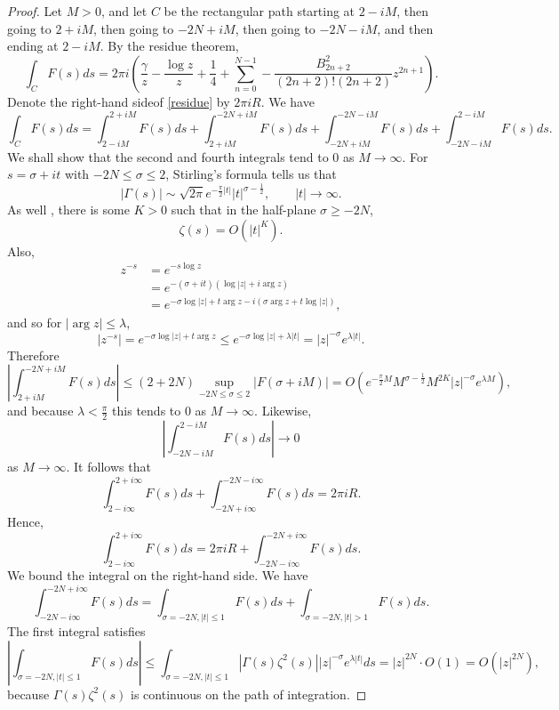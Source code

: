 \documentclass{article}
\theoremstyle{definition}
\begin{document}
\begin{proof}
Let $M>0$,
and let $C$ be the rectangular path  starting at $2-iM$, then going to $2+iM$, then going to $-2N+iM$,  then going to $-2N-iM$, and then ending 
at $2-iM$. 
By the residue theorem,
\begin{equation}
\int_C F(s) ds = 2\pi i\left(\frac{\gamma}{z}-\frac{\log z}{z}+\frac{1}{4} + \sum_{n=0}^{N-1}  -\frac{B_{2n+2}^2}{(2n+2)!(2n+2)} z^{2n+1}
\right).
\label{residue}
\end{equation}
Denote the right-hand sideof \eqref{residue}  by $2\pi i R$.
We have
\[
\int_C F(s) ds = 
\int_{2-iM}^{2+iM} F(s) ds + \int_{2+iM}^{-2N+iM} F(s) ds
+ \int_{-2N+iM}^{-2N-iM} F(s) ds +
\int_{-2N-iM}^{2-iM} F(s) ds.
\]
We shall show that the second and fourth integrals tend to $0$ as $M \to \infty$.
For $s=\sigma+it$ with $-2N \leq \sigma \leq 2$, Stirling's formula \cite[p.~151]{functions}  tells us that
\[
|\Gamma(s)| \sim \sqrt{2\pi} e^{-\frac{\pi}{2} |t|} |t|^{\sigma-\frac{1}{2}}, \qquad |t| \to \infty.
\]
As well \cite[p.~95]{zeta},
there is some $K>0$  such that in the half-plane $\sigma \geq -2N$,
\[
\zeta(s)=O(|t|^K).
\]
Also,
\begin{align*}
z^{-s} &= e^{-s \log z}\\
& = e^{-(\sigma+it)(\log |z|+i\arg z)} \\
&= e^{-\sigma \log|z| + t \arg z - i(\sigma \arg z+t \log|z|)},
\end{align*}
and so for $|\arg z| \leq \lambda$,
\[
|z^{-s}| = e^{-\sigma \log|z| + t \arg z}  \leq e^{-\sigma \log |z|+\lambda |t|} = |z|^{-\sigma} e^{\lambda |t|}.
\]
Therefore
\[
\left| \int_{2+iM}^{-2N+iM} F(s) ds \right| 
\leq (2+2N) \sup_{-2N \leq \sigma \leq 2} |F(\sigma+iM)|
=O(e^{-\frac{\pi}{2} M} M^{\sigma-\frac{1}{2}} M^{2K}  |z|^{-\sigma} e^{\lambda M}),
\]
and because $\lambda<\frac{\pi}{2}$ this tends to $0$ as $M \to \infty$.
Likewise,
\[
\left|\int_{-2N-iM}^{2-iM} F(s) ds \right| \to 0
\]
as $M \to \infty$. It follows that
\[
\int_{2-i\infty}^{2+i\infty} F(s) ds +\int_{-2N+i\infty}^{-2N-i\infty} F(s) ds
=2\pi i R.
\]
Hence,
\[
\int_{2-i\infty}^{2+i\infty} F(s) ds = 2\pi i R + \int_{-2N-i\infty}^{-2N+i\infty} F(s) ds.
\]
We bound the integral on the right-hand side. We have
\[
 \int_{-2N-i\infty}^{-2N+i\infty} F(s) ds = 
  \int_{\sigma=-2N, |t| \leq 1} F(s) ds+
    \int_{\sigma=-2N, |t| > 1} F(s)ds.
\]
The first integral satisfies
\[
\left|   \int_{\sigma=-2N, |t| \leq 1} F(s) ds \right|
\leq  \int_{\sigma=-2N, |t| \leq 1} |\Gamma(s) \zeta^2(s)|  |z|^{-\sigma} e^{\lambda |t|}
ds
= |z|^{2N} \cdot O(1) = O(|z|^{2N}),
\]
because $\Gamma(s) \zeta^2(s)$ is continuous on the path of integration.

\end{proof}
\end{document}
